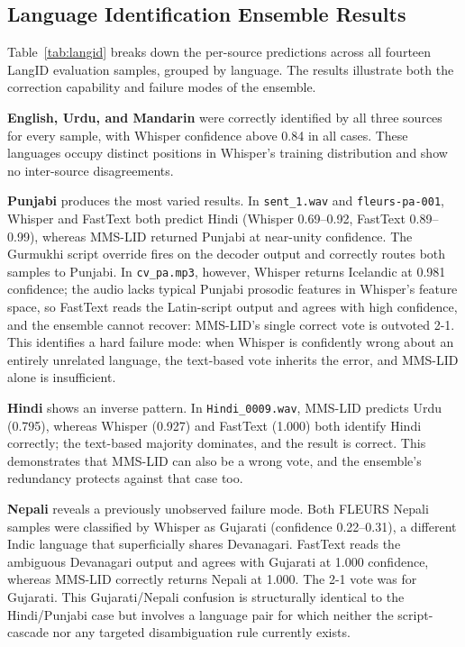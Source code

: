 \documentclass[conference]{IEEEtran}
\begin{document}
\subsection{Language Identification Ensemble Results}
\label{sec:langid}

Table~\ref{tab:langid} breaks down the per-source predictions across all fourteen LangID evaluation samples, grouped by language. The results illustrate both the correction capability and failure modes of the ensemble.

\textbf{English, Urdu, and Mandarin} were correctly identified by all three sources for every sample, with Whisper confidence above 0.84 in all cases. These languages occupy distinct positions in Whisper's training distribution and show no inter-source disagreements.

\textbf{Punjabi} produces the most varied results. In \texttt{sent\_1.wav} and \texttt{fleurs-pa-001}, Whisper and FastText both predict Hindi (Whisper 0.69--0.92, FastText 0.89--0.99), whereas MMS-LID returned Punjabi at near-unity confidence. The Gurmukhi script override fires on the decoder output and correctly routes both samples to Punjabi. In \texttt{cv\_pa.mp3}, however, Whisper returns Icelandic at 0.981 confidence; the audio lacks typical Punjabi prosodic features in Whisper's feature space, so FastText reads the Latin-script output and agrees with high confidence, and the ensemble cannot recover: MMS-LID's single correct vote is outvoted 2-1. This identifies a hard failure mode: when Whisper is confidently wrong about an entirely unrelated language, the text-based vote inherits the error, and MMS-LID alone is insufficient.

\textbf{Hindi} shows an inverse pattern. In \texttt{Hindi\_0009.wav}, MMS-LID predicts Urdu (0.795), whereas Whisper (0.927) and FastText (1.000) both identify Hindi correctly; the text-based majority dominates, and the result is correct. This demonstrates that MMS-LID can also be a wrong vote, and the ensemble's redundancy protects against that case too.

\textbf{Nepali} reveals a previously unobserved failure mode. Both FLEURS Nepali samples were classified by Whisper as Gujarati (confidence 0.22--0.31), a different Indic language that superficially shares Devanagari. FastText reads the ambiguous Devanagari output and agrees with Gujarati at 1.000 confidence, whereas MMS-LID correctly returns Nepali at 1.000. The 2-1 vote was for Gujarati. This Gujarati/Nepali confusion is structurally identical to the Hindi/Punjabi case but involves a language pair for which neither the script-cascade nor any targeted disambiguation rule currently exists.
\end{document}
